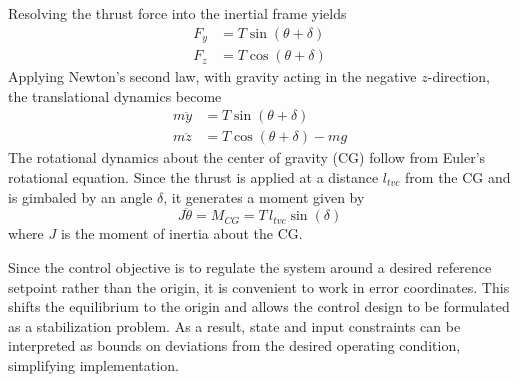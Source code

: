 \documentclass[10pt,twocolumn,twoside]{IEEEtran}
\begin{document}
Resolving the thrust force into the inertial frame yields
\begin{equation}
    \begin{aligned}
        F_y &= T \sin(\theta + \delta) \\
        F_z &= T \cos(\theta + \delta)
    \end{aligned}
    \label{eq:1.2}
\end{equation}
Applying Newton's second law, with gravity acting in the negative $z$-direction, the translational dynamics become
\begin{equation}
    \begin{aligned}
        m\ddot{y} &= T \sin(\theta + \delta) \\
        m\ddot{z} &= T \cos(\theta + \delta) - mg
    \end{aligned}
    \label{eq:1.3}
\end{equation}
The rotational dynamics about the center of gravity (CG) follow from Euler's rotational equation. Since the thrust is applied at a distance $l_{tvc}$ from the CG and is gimbaled by an angle $\delta$, it generates a moment given by
\begin{equation}
    J\ddot{\theta} = M_{CG} = T\, l_{tvc} \sin(\delta)
    \label{eq:1.4}
\end{equation}
where $J$ is the moment of inertia about the CG.

Since the control objective is to regulate the system around a desired reference setpoint rather than the origin, it is convenient to work in error coordinates. This shifts the equilibrium to the origin and allows the control design to be formulated as a stabilization problem. As a result, state and input constraints can be interpreted as bounds on deviations from the desired operating condition, simplifying implementation.
\end{document}
